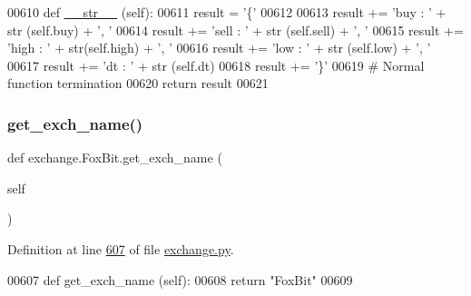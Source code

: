 \begin{DoxyCode}
00610     \textcolor{keyword}{def }\hyperlink{namespacerates_a2f1a70c33ee9e255938e4c19fd207264}{\_\_str\_\_} (self):
00611         result = \textcolor{stringliteral}{'\{'}
00612         
00613         result += \textcolor{stringliteral}{'buy : '} + str (self.buy) + \textcolor{stringliteral}{', '}
00614         result += \textcolor{stringliteral}{'sell : '} + str (self.sell) + \textcolor{stringliteral}{', '}
00615         result += \textcolor{stringliteral}{'high : '} + str(self.high) + \textcolor{stringliteral}{', '}
00616         result += \textcolor{stringliteral}{'low  : '} + str (self.low) + \textcolor{stringliteral}{', '}
00617         result += \textcolor{stringliteral}{'dt :  '} + str (self.dt)
00618         result += \textcolor{stringliteral}{'\}'}
00619         \textcolor{comment}{# Normal function termination}
00620         \textcolor{keywordflow}{return} result 
00621     
\end{DoxyCode}
\mbox{\label{classexchange_1_1_fox_bit_a9bb3b48ee388b422f1d27c1774f0c9bf}} 
\subsubsection{\texorpdfstring{get\+\_\+exch\+\_\+name()}{get\_exch\_name()}}
{\footnotesize\ttfamily def exchange.\+Fox\+Bit.\+get\+\_\+exch\+\_\+name (\begin{DoxyParamCaption}\item[{}]{self }\end{DoxyParamCaption})}



Definition at line \hyperlink{exchange_8py_source_l00607}{607} of file \hyperlink{exchange_8py_source}{exchange.\+py}.


\begin{DoxyCode}
00607     \textcolor{keyword}{def }get\_exch\_name (self):
00608         \textcolor{keywordflow}{return} \textcolor{stringliteral}{"FoxBit"}
00609         
\end{DoxyCode}
\mbox{\label{classexchange_1_1_fox_bit_a091fb1b6e76b392b0a018a411f9da200}} 
